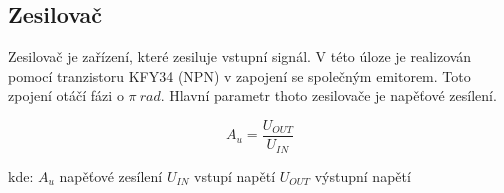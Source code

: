 			
		\subsection*{Zesilovač}
			\indent\indent
			Zesilovač je zařízení, které zesiluje vstupní signál. V této úloze je realizován pomocí tranzistoru KFY34 (NPN) v zapojení se společným emitorem. Toto zpojení otáčí fázi o $\pi~rad$. Hlavní parametr thoto zesilovače je napěťové zesílení.
			
			\begin{equation}
  			A_u = \dfrac{U_{OUT}}{U_{IN}}
			\end{equation}
	
			\hspace*{2cm}kde:\newline    
			\hspace*{4cm}$A_u$ \dotfill napěťové zesílení\hspace*{4cm}\newline
			\hspace*{4cm}$U_{IN}$ \dotfill vstupí napětí\hspace*{4cm}\newline
			\hspace*{4cm}$U_{OUT}$ \dotfill výstupní napětí\hspace*{4cm}\newline
  
  



